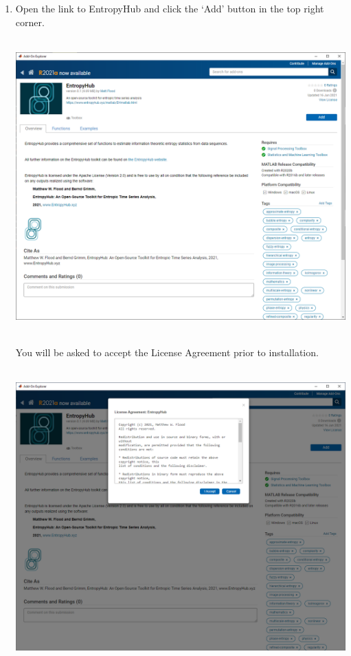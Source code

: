 \documentclass[12pt, a4paper, titlepage, openany]{book}
\begin{document}
\begin{enumerate}
\item Open the link to EntropyHub and click the ‘Add’ button in the top right corner.\\ \ \\
\begin{minipage}[h]{\linewidth}
          \centering
          \includegraphics[scale=.35]{matscreen4.png}\\ \ \\
          \medskip
\end{minipage}
\newline
You will be asked to accept the License Agreement prior to installation.\\ \ \\
\begin{minipage}[h]{\linewidth}
          \centering
          \includegraphics[scale=.35]{matscreen5.png}
          \medskip
\end{minipage}

\end{enumerate}
\end{document}
